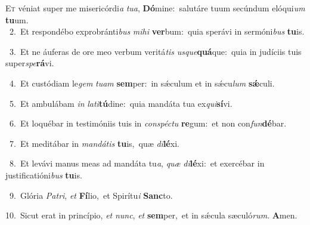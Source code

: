 \lettrine{\initial\textcolor{\initialcolor}{E}}{t} véniat super me misericórdi\textit{a} \textit{tu}\-\textit{a}, \textbf{Dó}\-mine:~\star salutáre tuum secúndum elóqui\textit{um} \textbf{tu}\-um.\\
{\numbfont\textcolor{\numbcolor}{~2.}}~Et respondébo exprobránti\textit{bus} \textit{mi}\-\textit{hi} \textbf{ver}\-bum:~\star quia sperávi in sermóni\textit{bus} \textbf{tu}\-is.\par
{\numbfont\textcolor{\numbcolor}{~3.}}~Et ne áuferas de ore meo verbum veritá\textit{tis} \textit{us}\-\textit{que}\textbf{quá}que:~\star quia in judíciis tuis super\-\textit{spe}\-\textbf{rá}vi.\par
{\numbfont\textcolor{\numbcolor}{~4.}}~Et custódiam le\textit{gem} \textit{tu}\-\textit{am} \textbf{sem}\-per:~\star in sǽculum et in sǽcu\textit{lum} \textbf{sǽ}\-culi.\par
{\numbfont\textcolor{\numbcolor}{~5.}}~Et ambulábam \textit{in} \textit{la}\-\textit{ti}\textbf{tú}dine:~\star quia mandáta tua ex\-\textit{qui}\-\textbf{sí}vi.\par
{\numbfont\textcolor{\numbcolor}{~6.}}~Et loquébar in testimóniis tuis in \textit{con}\-\textit{spéc}\textit{tu} \textbf{re}\-gum:~\star et non con\-\textit{fun}\-\textbf{dé}bar.\par
{\numbfont\textcolor{\numbcolor}{~7.}}~Et meditábar in \textit{man}\-\textit{dá}\textit{tis} \textbf{tu}\-is,~\star quæ \textit{di}\-\textbf{lé}xi.\par
{\numbfont\textcolor{\numbcolor}{~8.}}~Et levávi manus meas ad mandáta tu\-\textit{a}\-, \textit{quæ} \textit{di}\-\textbf{lé}xi:~\star et exercébar in justificatióni\textit{bus} \textbf{tu}\-is.\par
{\numbfont\textcolor{\numbcolor}{~9.}}~Glória \textit{Pa}\-\textit{tri}, \textit{et} \textbf{Fí}\-lio,~\star et Spirítu\textit{i} \textbf{Sanc}\-to.\par
{\numbfont\textcolor{\numbcolor}{10.}}~Sicut erat in princípio, \textit{et} \textit{nunc}\-, \textit{et} \textbf{sem}\-per,~\star et in sǽcula sæculó\-\textit{rum}\-. \textbf{A}\-men.\par
